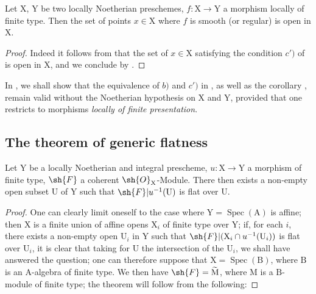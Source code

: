 \begin{corollary}[6.8.7]
\label{IV.6.8.7}
Let $\mathrm{X}$, $\mathrm{Y}$ be two locally Noetherian preschemes, $f:\mathrm{X}\to\mathrm{Y}$ a morphism locally of finite type. Then the set of points $x\in\mathrm{X}$ where $f$ is smooth \textnormal{(}or regular\textnormal{)} is open in $\mathrm{X}$.
\end{corollary}

\begin{proof}
Indeed it follows from  that the set of $x\in\mathrm{X}$ satisfying the condition $c')$ of  is open in $\mathrm{X}$, and we conclude by .
\end{proof}

\begin{remark}[6.8.8]
\label{IV.6.8.8}
In , we shall show that the equivalence of $b)$ and $c')$ in , as well as the corollary , remain valid without the Noetherian hypothesis on $\mathrm{X}$ and $\mathrm{Y}$, provided that one restricts to morphisms \emph{locally of finite presentation}.
\end{remark}

\subsection{The theorem of generic flatness}
\label{subsection:IV.6.9}

\begin{theorem}[6.9.1]
\label{IV.6.9.1}
Let $\mathrm{Y}$ be a locally Noetherian and integral prescheme, $u:\mathrm{X}\to\mathrm{Y}$ a morphism of finite type, $\sh{F}$ a coherent $\sh{O}_\mathrm{X}$-Module. There then exists a non-empty open subset $\mathrm{U}$ of $\mathrm{Y}$ such that $\sh{F}|u^{-1}(\mathrm{U})$ is flat over $\mathrm{U}$.
\end{theorem}

\begin{proof}
One can clearly limit oneself to the case where $\mathrm{Y}=\operatorname{Spec}(\mathrm{A})$ is affine; then $\mathrm{X}$ is a finite union of affine opens $\mathrm{X}_i$ of finite type over $\mathrm{Y}$; if, for each $i$, there exists a non-empty open $\mathrm{U}_i$ in $\mathrm{Y}$ such that $\sh{F}|(\mathrm{X}_i\cap u^{-1}(\mathrm{U}_i))$ is flat over $\mathrm{U}_i$, it is clear that taking for $\mathrm{U}$ the intersection of the $\mathrm{U}_i$, we shall have answered the question; one can therefore suppose that $\mathrm{X}=\operatorname{Spec}(\mathrm{B})$, where $\mathrm{B}$ is an $\mathrm{A}$-algebra of finite type. We then have $\sh{F}=\widetilde{\mathrm{M}}$, where $\mathrm{M}$ is a $\mathrm{B}$-module of finite type; the theorem will follow from the following:
\end{proof}


